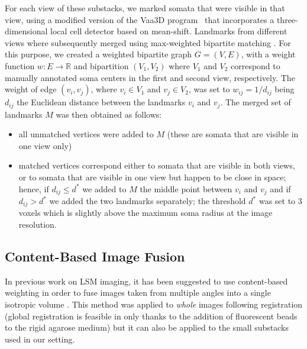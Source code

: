\documentclass[smallextended]{svjour3}       %
\begin{document}
For each view of these substacks, we marked somata that were visible
in that view, using a modified version of the Vaa3D
program~\cite{peng_v3d_2010} that incorporates a three-dimensional local
cell detector based on mean-shift.
Landmarks from different views where subsequently merged using max-weighted bipartite
matching \cite{galil_efficient_1986}. For this purpose, we created
a weighted bipartite graph $G=(V,E)$, with a weight function
$w: E\rightarrow \mathbb{R}$ and bipartition $(V_1,V_2)$ where $V_1$
and $V_2$ correspond to manually annotated soma centers in the first
and second view, respectively. The weight of edge $(v_i,v_j)$, where
$v_i \in V_1$ and $v_j \in V_2$, was set to $w_{ij}=1/d_{ij}$ being
$d_{ij}$ the Euclidean distance between the landmarks
$v_i$ and $v_j$. The merged set of landmarks $M$ was then obtained as
follows:
\begin{itemize}
\item all unmatched vertices were added to $M$ (these are somata that
  are visible in one view only)
\item matched vertices correspond either to somata that are visible in
  both views, or to somata that are visible in one view but happen to
  be close in space; hence, if $d_{ij}\leq d^*$ we added to $M$ the
  middle point between $v_i$ and $v_j$ and if $d_{ij}> d^*$ we added
  the two landmarks separately; the threshold $d^*$ was set to $3$
  voxels which is slightly above the maximum soma radius at the image
  resolution.
\end{itemize}



\subsection{Content-Based Image Fusion}
\label{sec:fusion}
In previous work on LSM
imaging, it has been suggested to use content-based weighting in order
to fuse images taken from multiple angles into a single isotropic
volume \cite{preibisch_mosaicing_2008}. This method was applied to
\textit{whole} images following registration (global registration is
feasible in \cite{preibisch_mosaicing_2008} only thanks to the addition
of fluorescent beads to the rigid agarose medium) but it can also
be applied to the small substacks used in our setting.
\end{document}
